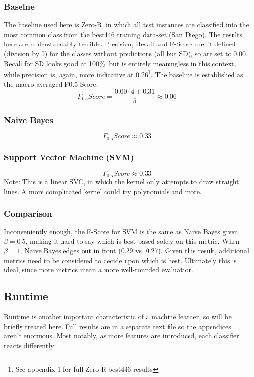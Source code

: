 \documentclass[twocolumn]{article}
\begin{document}
\subsubsection{Baselne}
The baseline used here is Zero-R, in which all test instances are classified into the most common class from the best446 training data-set (San Diego). The results here are understandably terrible. Precision, Recall and F-Score aren't defined (division by 0) for the classes without predictions (all but SD), so are set to 0.00. Recall for SD looks good at 100\%, but is entirely meaningless in this context, while precision is, again, more indicative at 0.26\footnote{See appendix 1 for full Zero-R best446 results}. The baseline is established as the macro-averaged F0.5-Score:
\begin{equation}
F_{0.5}Score = \frac{0.00 \cdot 4 + 0.31}{5} \approx 0.06
\end{equation}

\subsubsection{Naive Bayes}
\begin{equation}
F_{0.5}Score \approx 0.33
\end{equation}
\subsubsection{Support Vector Machine (SVM)}
\begin{equation}
F_{0.5}Score \approx 0.33
\end{equation}
Note: This is a linear SVC, in which the kernel only attempts to draw straight lines. A more complicated kernel could try polynomials and more.

\subsubsection{Comparison}
Inconveniently enough, the F-Score for SVM is the same as Naive Bayes given $\beta = 0.5$, making it hard to say which is best based solely on this metric. When $\beta = 1$, Naive Bayes edges out in front (0.29 vs. 0.27). Given this result, additional metrics need to be considered to decide upon which is best. Ultimately this is ideal, since more metrics mean a more well-rounded evaluation.

\subsection{Runtime}
Runtime is another important characteristic of a machine learner, so will be briefly treated here. Full results are in a separate text file so the appendices aren't enormous. Most notably, as more features are introduced, each classifier reacts differently:
\end{document}
